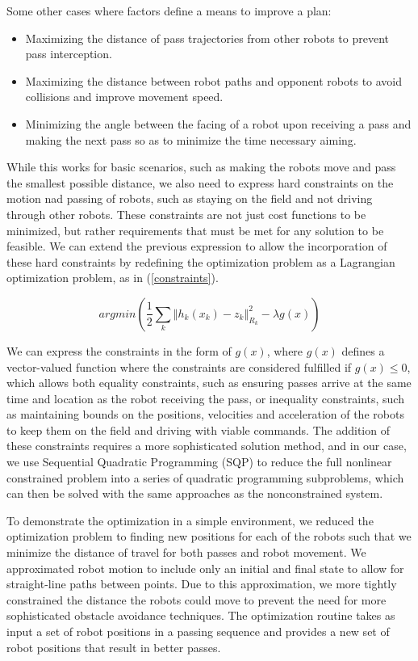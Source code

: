 \documentclass[a4paper, 10pt, conference]{ieeeconf}      %
\begin{document}
Some other cases where factors define a means to improve a plan:
\begin{itemize}
 \item Maximizing the distance of pass trajectories from other robots to prevent pass interception.
 \item Maximizing the distance between robot paths and opponent robots to avoid collisions and improve movement speed.
 \item Minimizing the angle between the facing of a robot upon receiving a pass and making the next pass so as to minimize the time necessary aiming.  
\end{itemize}


While this works for basic scenarios, such as making the robots move and pass the smallest possible distance, we also need to express hard constraints on the motion nad passing of robots, such as staying on the field and not driving through other robots.  These constraints are not just cost functions to be minimized, but rather requirements that must be met for any solution to be feasible.  We can extend the previous expression to allow the incorporation of these hard constraints by redefining the optimization problem as a Lagrangian optimization problem, as in (\ref{constraints}).  

\begin{equation} \label{constraints}
 argmin(\frac{1}{2}\sum_{k}\left\Vert h_{k}(x_{k})-z_{k}\right\Vert _{R_{k}}^{2}-\lambda g(x))
\end{equation} 

We can express the constraints in the form of $g(x)$, where $g(x)$ defines a vector-valued function where the constraints are considered fulfilled if $g(x)\leq 0$, which allows both equality constraints, such as ensuring passes arrive at the same time and location as the robot receiving the pass, or inequality constraints, such as maintaining bounds on the positions, velocities and acceleration of the robots to keep them on the field and driving with viable commands.  The addition of these constraints requires a more sophisticated solution method, and in our case, we use Sequential Quadratic Programming (SQP) to reduce the full nonlinear constrained problem into a series of quadratic programming subproblems, which can then be solved with the same approaches as the nonconstrained system\cite{Fletcher87book}.  

To demonstrate the optimization in a simple environment, we reduced the optimization problem to finding new positions for each of the robots such that we minimize the distance of travel for both passes and robot movement.  We approximated robot motion to include only an initial and final state to allow for straight-line paths between points.  Due to this approximation, we more tightly constrained the distance the robots could move to prevent the need for more sophisticated obstacle avoidance techniques.  The optimization routine takes as input a set of robot positions in a passing sequence and provides a new set of robot positions that result in better passes.  
\end{document}
